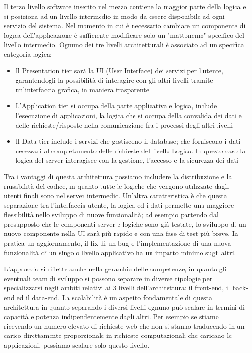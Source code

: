 Il terzo livello software inserito nel mezzo contiene la maggior parte della logica
e si posiziona ad un livello intermedio in modo da essere disponibile ad ogni
servizio del sistema. Nel momento in cui è necessario cambiare un componente di
logica dell’applicazione è sufficiente modificare solo un "mattoncino" specifico del
livello intermedio.
Ognuno dei tre livelli architetturali è associato ad un specifica categoria logica:
\begin{itemize}
	\item Il Presentation tier sarà la UI (User Interface) dei servizi per l’utente,
	garantendogli la possibilità di interagire con gli altri livelli tramite
	un'interfaccia grafica, in maniera trasparente
	\item L'Application tier si occupa della parte applicativa e logica,
	include l’esecuzione di applicazioni, la logica che si occupa della convalida
	dei dati e delle richieste/risposte nella comunicazione fra i processi degli
	altri livelli
	\item Il Data tier include i servizi che gestiscono il database; che forniscono
	i dati necessari al completamento delle richieste del livello Logico. In questo
	caso la logica del server interagisce con la gestione, l’accesso e la sicurezza
	dei dati
\end{itemize}
Tra i vantaggi di questa architettura possiamo includere la distribuzione e la
riusabilità del codice, in quanto tutte le logiche che vengono utilizzate dagli
utenti finali sono nel server intermedio. Un'altra caratteristica è che questa
separazione tra l'interfaccia utente, la logica ed i dati permette una maggiore
flessibilità nello sviluppo di nuove funzionalità; ad esempio partendo dal presupposto
che le componenti server e logiche sono già testate, lo sviluppo di un nuovo
componente nella UI sarà più rapido e con una fase di test più breve. In pratica
un aggiornamento, il fix di un bug o l'implementazione di una nuova funzionalità
di un singolo livello applicativo ha un impatto minimo sugli altri.

L'approccio si riflette anche nella gerarchia delle competenze, in quanto gli
eventuali team di sviluppo si possono separare in diverse tipologie per
specializzarsi negli ambiti relativi ai 3 livelli dell'architettura: il front-end,
il back-end ed il data-end. La scalabilità è un aspetto fondamentale di questa
architettura in quanto separando i diversi livelli ognuno può scalare in termini
di capacità e potenza indipendentemente dagli altri. Per esempio se stiamo ricevendo
un numero elevato di richieste web che non si stanno traducendo in un carico
direttamente proporzionale in richieste computazionali che caricano le applicazioni,
possiamo scalare solo questo livello.


